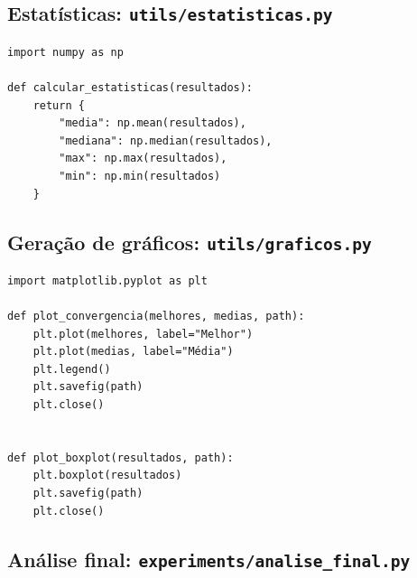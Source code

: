 \documentclass[a4paper,12pt]{article}
\begin{document}
\newpage
\subsection{Estatísticas: \texttt{utils/estatisticas.py}}

\begin{lstlisting}[caption={utils/estatisticas.py}]
import numpy as np

def calcular_estatisticas(resultados):
    return {
        "media": np.mean(resultados),
        "mediana": np.median(resultados),
        "max": np.max(resultados),
        "min": np.min(resultados)
    }
\end{lstlisting}

\subsection{Geração de gráficos: \texttt{utils/graficos.py}}

\begin{lstlisting}[caption={utils/graficos.py}]
import matplotlib.pyplot as plt

def plot_convergencia(melhores, medias, path):
    plt.plot(melhores, label="Melhor")
    plt.plot(medias, label="Média")
    plt.legend()
    plt.savefig(path)
    plt.close()


def plot_boxplot(resultados, path):
    plt.boxplot(resultados)
    plt.savefig(path)
    plt.close()
\end{lstlisting}

\newpage
\subsection{Análise final: \texttt{experiments/analise\_final.py}}
\end{document}
